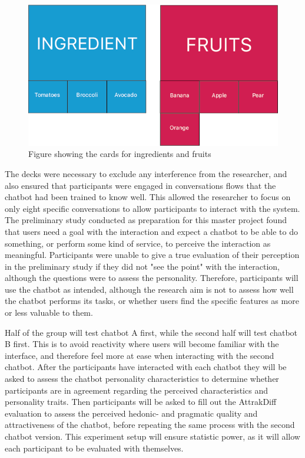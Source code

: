      \begin{figure}[h]
            \centering
            \includegraphics[scale=0.5]{figures/Ingredientfruit.png}
            \caption{Figure showing the cards for ingredients and fruits}
            \label{fig:userneed}
        \end{figure}

   The decks were necessary to exclude any interference from the researcher, and also ensured that participants were engaged in conversations flows that the chatbot had been trained to know well. This allowed the researcher to focus on only eight specific conversations to allow participants to interact with the system. The preliminary study conducted as preparation for this master project found that users need a goal with the interaction and expect a chatbot to be able to do something, or perform some kind of service, to perceive the interaction as meaningful. Participants were unable to give a true evaluation of their perception in the preliminary study if they did not "see the point" with the interaction, although the questions were to assess the personality. Therefore, participants will use the chatbot as intended, although the research aim is not to assess how well the chatbot performs its tasks, or whether users find the specific features as more or less valuable to them.
   
   Half of the group will test chatbot A first, while the second half will test chatbot B first. This is to avoid reactivity where users will become familiar with the interface, and therefore feel more at ease when interacting with the second chatbot. After the participants have interacted with each chatbot they will be asked to assess the chatbot personality characteristics to determine whether participants are in agreement regarding the perceived characteristics and personality traits. Then participants will be asked to fill out the AttrakDiff evaluation to assess the perceived hedonic- and pragmatic quality and attractiveness of the chatbot, before repeating the same process with the second chatbot version. This experiment setup will ensure statistic power, as it will allow each participant to be evaluated with themselves.
    

   